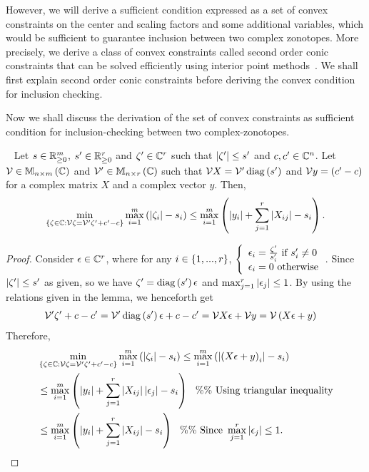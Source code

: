 However, we will derive a sufficient condition expressed as a set of
convex constraints on the center and scaling factors and some
additional variables, which would be sufficient to guarantee inclusion
between two complex zonotopes.  More precisely, we derive a class of
convex constraints called second order conic constraints that can be
solved efficiently using interior point methods~\cite{todo}.  We shall
first explain second order conic constraints before deriving
the convex condition for inclusion checking.


Now we shall discuss the derivation of the set of convex constraints
as sufficient condition for inclusion-checking between two
complex-zonotopes.
%
\begin{lemma}~\label{lem:transfer-matrix}
  Let $s\in\mathbb{R}^m_{\geq 0}$, $s^\prime\in\mathbb{R}^r_{\geq 0}$
  and $\zeta^\prime\in\mathbb{C}^r$ such that
  $\left|\zeta^\prime\right|\leq s^\prime$ and
  $c,c^\prime\in\mathbb{C}^n$.  Let $\mathcal{V}\in\mathbb{M}_{n\times m}\left(\mathbb{C}\right)$
  and $\mathcal{V}^\prime\in\mathbb{M}_{n\times r}\left(\mathbb{C}\right)$ such that $\mathcal{V}X=\mathcal{V}^\prime\operatorname{diag}\left(s^\prime\right)$ and
  $\mathcal{V}y=\left(c^\prime-c\right)$ for a complex matrix $X$ and a
  complex vector $y$.  Then,
\begin{equation}\label{eqn:transfer-matrix}
\min_{\left\{\zeta\in\mathbb{C}:\mathcal{V}\zeta=\mathcal{V}^\prime\zeta^\prime+c^\prime-c\right\}}\max_{i=1}^m\left(\left|\zeta_i\right|-s_i\right)\leq \max_{i=1}^m\left(\left|y_i\right|+\sum_{j=1}^r\left|X_{ij}\right|-s_i\right).
\end{equation}
%
\end{lemma}
%
\begin{proof}
Consider $\epsilon\in\mathbb{C}^{r}$, where for any $i\in\left\{1,...,r\right\}$,
%
$\left\{
\begin{array}{l}
\epsilon_i=\frac{\zeta^\prime}{s^\prime_i}~\text{if}~ s^\prime_i\neq 0\\
\epsilon_i=0~\text{otherwise}
\end{array}
\right.$.
%
Since $\left|\zeta^\prime\right|\leq s^\prime$ as given, so
we have $\zeta^\prime=\operatorname{diag}\left(s^\prime\right)\epsilon$ and
$\max_{j=1}^r\left|\epsilon_j\right|\leq 1$.  By
using the relations given in the lemma, we henceforth get
%
\begin{align*}
&\mathcal{V}^\prime\zeta^\prime+c-c^\prime
=\mathcal{V}^\prime\operatorname{diag}\left(s^\prime\right)\epsilon+c-c^\prime
=\mathcal{V}X\epsilon+\mathcal{V}y
=\mathcal{V}\left(X\epsilon+y\right)
\end{align*}
%
Therefore,
%
\begin{align*}
& \min_{\left\{\zeta\in\mathbb{C}:\mathcal{V}\zeta=\mathcal{V}^\prime\zeta^\prime+c^\prime-c\right\}}\max_{i=1}^m\left(\left|\zeta_i\right|-s_i\right)\leq \max_{i=1}^m\left(\left|\left(X\epsilon+y\right)_i\right|-s_i\right)\\
&\leq \max_{i=1}^m\left(\left|y_i\right|+\sum_{j=1}^r\left|X_{ij}\right|\left|\epsilon_j\right|-s_i\right)
~~\%\%~\text{Using triangular inequality}\\
& \leq  \max_{i=1}^m\left(\left|y_i\right|+\sum_{j=1}^r\left|X_{ij}\right|-s_i\right)
~~\%\%~\text{Since}~\max_{j=1}^r\left|\epsilon_j\right|\leq 1.
\end{align*}
%
\end{proof}

